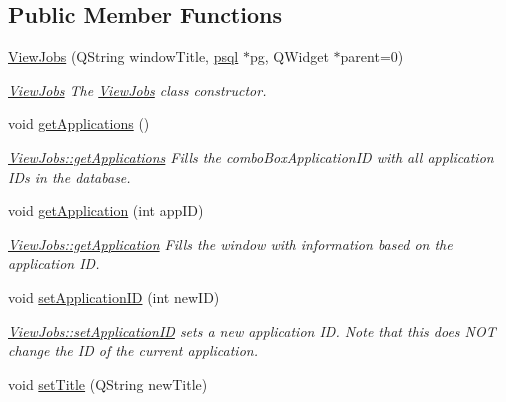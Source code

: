 \subsection*{Public Member Functions}
\begin{DoxyCompactItemize}
\item 
\mbox{\hyperlink{class_view_jobs_ac78f48cc812a0348a233f33dc78a71cc}{View\+Jobs}} (Q\+String window\+Title, \mbox{\hyperlink{classpsql}{psql}} $\ast$pg, Q\+Widget $\ast$parent=0)
\begin{DoxyCompactList}\small\item\em \mbox{\hyperlink{class_view_jobs}{View\+Jobs}} The \mbox{\hyperlink{class_view_jobs}{View\+Jobs}} class constructor. \end{DoxyCompactList}\item 
\mbox{\label{class_view_jobs_af97593f0db01caee0febfe774a823e9c}} 
void \mbox{\hyperlink{class_view_jobs_af97593f0db01caee0febfe774a823e9c}{get\+Applications}} ()
\begin{DoxyCompactList}\small\item\em \mbox{\hyperlink{class_view_jobs_af97593f0db01caee0febfe774a823e9c}{View\+Jobs\+::get\+Applications}} Fills the combo\+Box\+Application\+ID with all application I\+Ds in the database. \end{DoxyCompactList}\item 
void \mbox{\hyperlink{class_view_jobs_ae9c1c806aa1dd5082b38a1dc9cbec39e}{get\+Application}} (int app\+ID)
\begin{DoxyCompactList}\small\item\em \mbox{\hyperlink{class_view_jobs_ae9c1c806aa1dd5082b38a1dc9cbec39e}{View\+Jobs\+::get\+Application}} Fills the window with information based on the application ID. \end{DoxyCompactList}\item 
void \mbox{\hyperlink{class_view_jobs_acd43a8c32ab9bca7e40ecc99e51da9b8}{set\+Application\+ID}} (int new\+ID)
\begin{DoxyCompactList}\small\item\em \mbox{\hyperlink{class_view_jobs_acd43a8c32ab9bca7e40ecc99e51da9b8}{View\+Jobs\+::set\+Application\+ID}} sets a new application ID. Note that this does N\+OT change the ID of the current application. \end{DoxyCompactList}\item 
void \mbox{\hyperlink{class_view_jobs_abfe1969197cde57ea049c1b7d91cd4f5}{set\+Title}} (Q\+String new\+Title)

\end{DoxyCompactItemize}
